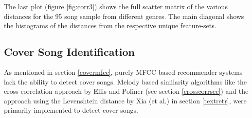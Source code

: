 \noindent The last plot (figure \ref{fig:corr3}) shows the full scatter matrix of the various distances for the 95 song sample from different genres. The main diagonal shows the histograms of the distances from the respective unique feature-sets.

\begin{figure}[htbp]
	\centering
\end{figure}
\FloatBarrier


\subsection{Cover Song Identification}\label{covsongid}

As mentioned in section \ref{covermfcc}, purely MFCC based recommender systems lack the ability to detect cover songs. Melody based similarity algorithms like the cross-correlation approach by Ellis and Poliner (see section \ref{crosscorrsec}) and the approach using the Levenshtein distance by Xia (et al.) in section \ref{textretr}, were primarily implemented to detect cover songs. 


